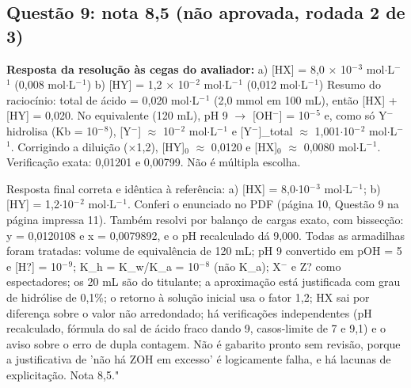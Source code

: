 \documentclass{article}%
\begin{document}
\subsection*{Questão 9: nota 8,5 (não aprovada, rodada 2 de 3)}%
\textbf{Resposta da resolução às cegas do avaliador:} a) {[}HX{]} = 8,0 $\times$ 10$^{-}$$^3$ mol$\cdot$L$^{-}$$^{1}$ (0,008 mol$\cdot$L$^{-}$$^{1}$)\newline%
b) {[}HY{]} = 1,2 $\times$ 10$^{-}$$^2$ mol$\cdot$L$^{-}$$^{1}$ (0,012 mol$\cdot$L$^{-}$$^{1}$)\newline%
\newline%
Resumo do raciocínio: total de ácido = 0,020 mol$\cdot$L$^{-}$$^{1}$ (2,0 mmol em 100 mL), então {[}HX{]} + {[}HY{]} = 0,020. No equivalente (120 mL), pH 9 $\to$ {[}OH$^{-}${]} = 10$^{-}$$^{5}$ e, como só Y$^{-}$ hidrolisa (Kb = 10$^{-}$$^{8}$), {[}Y$^{-}${]} $\approx$ 10$^{-}$$^2$ mol$\cdot$L$^{-}$$^{1}$ e {[}Y$^{-}${]}\_total $\approx$ 1,001$\cdot$10$^{-}$$^2$ mol$\cdot$L$^{-}$$^{1}$. Corrigindo a diluição ($\times$1,2), {[}HY{]}$_{0}$ $\approx$ 0,0120 e {[}HX{]}$_{0}$ $\approx$ 0,0080 mol$\cdot$L$^{-}$$^{1}$. Verificação exata: 0,01201 e 0,00799. Não é múltipla escolha.\par %
Resposta final correta e idêntica à referência: a) {[}HX{]} = 8,0$\cdot$10$^{-}$$^3$ mol$\cdot$L$^{-}$$^{1}$; b) {[}HY{]} = 1,2$\cdot$10$^{-}$$^2$ mol$\cdot$L$^{-}$$^{1}$. Conferi o enunciado no PDF (página 10, Questão 9 na página impressa 11). Também resolvi por balanço de cargas exato, com bissecção: y = 0,0120108 e x = 0,0079892, e o pH recalculado dá 9,000. Todas as armadilhas foram tratadas: volume de equivalência de 120 mL; pH 9 convertido em pOH = 5 e {[}H?{]} = 10$^{-}$$^{9}$; K\_h = K\_w/K\_a = 10$^{-}$$^{8}$ (não K\_a); X$^{-}$ e Z? como espectadores; os 20 mL são do titulante; a aproximação está justificada com grau de hidrólise de 0,1\%; o retorno à solução inicial usa o fator 1,2; HX sai por diferença sobre o valor não arredondado; há verificações independentes (pH recalculado, fórmula do sal de ácido fraco dando 9, casos{-}limite de 7 e 9,1) e o aviso sobre o erro de dupla contagem. Não é gabarito pronto sem revisão, porque a justificativa de 'não há ZOH em excesso' é logicamente falha, e há lacunas de explicitação. Nota 8,5."%
\end{document}
